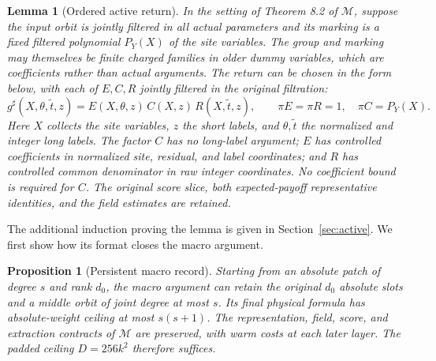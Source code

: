\documentclass[11pt,a4paper]{article}
\newtheorem{lemma}[theorem]{Lemma}
\newtheorem{proposition}[theorem]{Proposition}
\theoremstyle{definition}
\newcommand{\M}{\mathcal M}
\begin{document}
\begin{lemma}[Ordered active return]\label{lem:active}
In the setting of Theorem 8.2 of \(\M\), suppose the input orbit is
jointly filtered in all actual parameters and its marking is a fixed
filtered polynomial \(P_Y(X)\) of the site variables. The group and
marking may themselves be finite charged families in older dummy
variables, which are coefficients rather than actual arguments.
The return can be chosen in the form below, with each of \(E,C,R\)
jointly filtered in the original filtration:
\begin{equation}\label{eq:ECR}
 g^\sharp(X,\theta,\widetilde t,z)
   =E(X,\theta,z)\,C(X,z)\,R(X,\widetilde t,z),
 \qquad
 \pi E=\pi R=1,\quad \pi C=P_Y(X).
\end{equation}
Here \(X\) collects the site variables, \(z\) the short labels, and
\(\theta,\widetilde t\) the normalized and integer long labels.
The factor \(C\) has no long-label argument; \(E\) has controlled coefficients
in normalized site, residual, and label coordinates; and \(R\) has
controlled common denominator in raw integer coordinates. No
coefficient bound is required for \(C\). The original score slice,
both expected-payoff representative identities, and the field
estimates are retained.
\end{lemma}

The additional induction proving the lemma is given in
Section~\ref{sec:active}. We first show how its format closes the macro
argument.

\begin{proposition}[Persistent macro record]\label{prop:macro}
Starting from an absolute patch of degree \(s\) and rank \(d_0\), the
macro argument can retain the original \(d_0\) absolute slots and a
middle orbit of joint degree at most \(s\). Its final physical formula
has absolute-weight ceiling at most \(s(s+1)\). The representation,
field, score, and extraction contracts of \(\M\) are preserved, with
warm costs at each later layer. The padded ceiling \(D=256k^2\)
therefore suffices.
\end{proposition}
\end{document}
